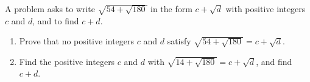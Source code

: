 A problem asks to write $\sqrt{54+\sqrt{180}}$ in the form $c+\sqrt d$ with positive integers $c$ and $d$, and to find $c+d$.
\begin{enumerate}
\item[(a)] Prove that no positive integers $c$ and $d$ satisfy $\sqrt{54+\sqrt{180}}=c+\sqrt d$.
\item[(b)] Find the positive integers $c$ and $d$ with $\sqrt{14+\sqrt{180}}=c+\sqrt d$, and find $c+d$.
\end{enumerate}
